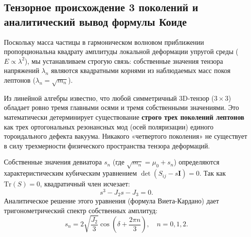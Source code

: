 \documentclass[11pt,a4paper]{article}
\begin{document}
\subsection{Тензорное происхождение 3 поколений и аналитический вывод формулы Коиде}
Поскольку масса частицы в гармоническом волновом приближении пропорциональна квадрату амплитуды локальной деформации упругой среды ($E \propto \lambda^2$), мы устанавливаем строгую связь: собственные значения тензора напряжений $\lambda_n$ являются квадратными корнями из наблюдаемых масс покоя лептонов ($\lambda_n = \sqrt{m_n}$).

Из линейной алгебры известно, что любой симметричный 3D-тензор ($3 \times 3$) обладает ровно тремя главными осями и тремя собственными значениями. Это математически детерминирует существование \textbf{строго трех поколений лептонов} как трех ортогональных резонансных мод (осей поляризации) единого тороидального дефекта вакуума. Никакого «четвертого поколения» не существует в силу трехмерности физического пространства тензора деформаций.

Собственные значения девиатора $s_n$ (где $\sqrt{m_n} = \mu_0 + s_n$) определяются характеристическим кубическим уравнением $\det(S_{ij} - s \mathbf{I}) = 0$. Так как $\text{Tr}(S)=0$, квадратичный член исчезает:
\begin{equation}
	s^3 - J_2 s - J_3 = 0.
\end{equation}
Аналитическое решение этого уравнения (формула Виета-Кардано) дает тригонометрический спектр собственных амплитуд:
\begin{equation}
	s_n = 2\sqrt{\frac{J_2}{3}} \cos\left( \delta + \frac{2\pi n}{3} \right), \quad n=0, 1, 2.
\end{equation}
\end{document}
